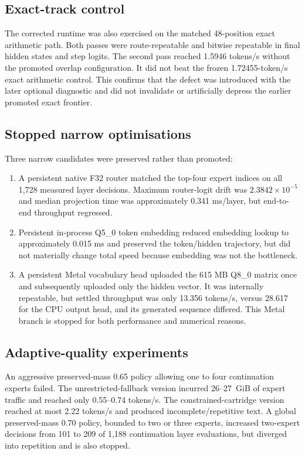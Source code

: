 \subsection{Exact-track control}

The corrected runtime was also exercised on the matched 48-position exact
arithmetic path.  Both passes were route-repeatable and bitwise repeatable in
final hidden states and step logits.  The second pass reached 1.5946 tokens/s
without the promoted overlap configuration.  It did not beat the frozen
1.72455-token/s exact arithmetic control.  This confirms that the defect was
introduced with the later optional diagnostic and did not invalidate or
artificially depress the earlier promoted exact frontier.

\subsection{Stopped narrow optimisations}

Three narrow candidates were preserved rather than promoted:

\begin{enumerate}
  \item A persistent native F32 router matched the top-four expert indices on
  all 1,728 measured layer decisions.  Maximum router-logit drift was
  $2.3842\times10^{-5}$ and median projection time was approximately
  0.341 ms/layer, but end-to-end throughput regressed.
  \item Persistent in-process Q5\_0 token embedding reduced embedding lookup to
  approximately 0.015 ms and preserved the token/hidden trajectory, but did
  not materially change total speed because embedding was not the bottleneck.
  \item A persistent Metal vocabulary head uploaded the 615 MB Q8\_0 matrix
  once and subsequently uploaded only the hidden vector.  It was internally
  repeatable, but settled throughput was only 13.356 tokens/s, versus 28.617
  for the CPU output head, and its generated sequence differed.  This Metal
  branch is stopped for both performance and numerical reasons.
\end{enumerate}

\subsection{Adaptive-quality experiments}

An aggressive preserved-mass 0.65 policy allowing one to four continuation
experts failed.  The unrestricted-fallback version incurred 26--27~GiB of
expert traffic and reached only 0.55--0.74 tokens/s.  The constrained-cartridge
version reached at most 2.22 tokens/s and produced incomplete/repetitive text.
A global preserved-mass 0.70 policy, bounded to two or three experts, increased
two-expert decisions from 101 to 209 of 1,188 continuation layer evaluations,
but diverged into repetition and is also stopped.

